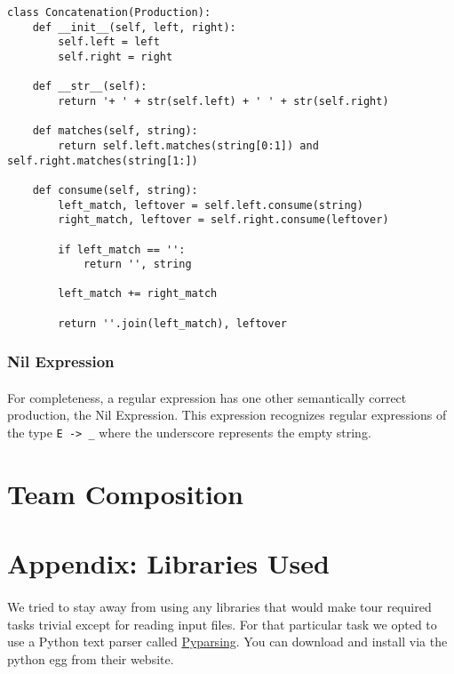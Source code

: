 \documentclass{article}
\begin{document}
\begin{verbatim}
class Concatenation(Production):
    def __init__(self, left, right):
        self.left = left
        self.right = right
    
    def __str__(self):
        return '+ ' + str(self.left) + ' ' + str(self.right)

    def matches(self, string):
        return self.left.matches(string[0:1]) and self.right.matches(string[1:])
    
    def consume(self, string):
        left_match, leftover = self.left.consume(string)
        right_match, leftover = self.right.consume(leftover)

        if left_match == '':
            return '', string
 
        left_match += right_match

        return ''.join(left_match), leftover
\end{verbatim}

\subsubsection{Nil Expression}
\paragraph{} For completeness, a regular expression has one other semantically
correct production, the Nil Expression. This expression recognizes regular 
expressions of the type \verb|E -> _| where the underscore represents the 
empty string. 

\section*{Team Composition}

\section*{Appendix: Libraries Used}
\paragraph{} We tried to stay away from using any libraries that would make
tour required tasks trivial except for reading input files. For that
particular task we opted to use a Python text parser called
\href{http://pyparsing.wikispaces.com/}{Pyparsing}. You can download
and install via the python egg from their website.
\end{document}
